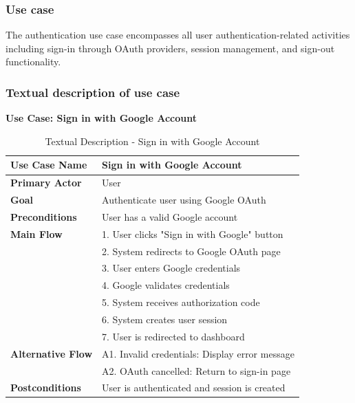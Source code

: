 \subsubsection{Use case}
The authentication use case encompasses all user authentication-related activities including sign-in through OAuth providers, session management, and sign-out functionality.

\subsubsection{Textual description of use case}

\textbf{Use Case: Sign in with Google Account}
\begin{table}[H]
\centering
\caption{Textual Description - Sign in with Google Account}
\label{tab:google_signin_description}
\begin{tabular}{|p{3cm}|p{10cm}|}
\hline
\textbf{Use Case Name} & Sign in with Google Account \\
\hline
\textbf{Primary Actor} & User \\
\hline
\textbf{Goal} & Authenticate user using Google OAuth \\
\hline
\textbf{Preconditions} & User has a valid Google account \\
\hline
\textbf{Main Flow} & 
1. User clicks "Sign in with Google" button \\
& 2. System redirects to Google OAuth page \\
& 3. User enters Google credentials \\
& 4. Google validates credentials \\
& 5. System receives authorization code \\
& 6. System creates user session \\
& 7. User is redirected to dashboard \\
\hline
\textbf{Alternative Flow} & 
A1. Invalid credentials: Display error message \\
& A2. OAuth cancelled: Return to sign-in page \\
\hline
\textbf{Postconditions} & User is authenticated and session is created \\
\hline
\end{tabular}
\end{table}

